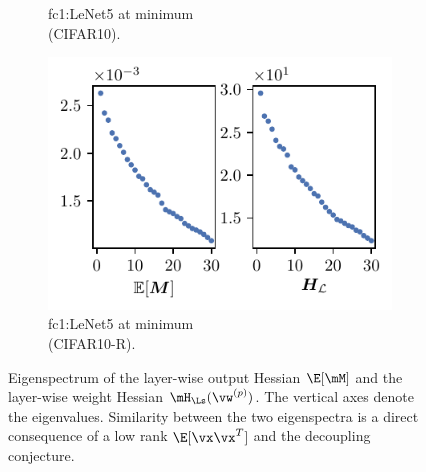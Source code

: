 \begin{figure}[h]
{\begin{subfigure}[b]{0.3\textwidth}
        \caption{fc1:LeNet5 at minimum\\ (CIFAR10).}
        \label{fig:UTAU_H_spec_Lenet}
    \end{subfigure}%
    \begin{subfigure}[b]{0.3\textwidth}
        \centering
        \captionsetup{justification=centering}
        \includegraphics[width=\textwidth]{Figures/EM_vs_H/LeNet5_RL/UTAU_vs_full_sigval_d30_CIFAR10_RandomLabel_LeNet5_fixlr0.01_RLR4_E-1_fc1.pdf}
        \caption{fc1:LeNet5 at minimum\\ (CIFAR10-R).}
        \label{fig:UTAU_H_spec_RL}
    \end{subfigure}%
    }
    
    \caption{Eigenspectrum of the layer-wise output Hessian $\E[\mM]$ and the layer-wise weight Hessian $\mH_\Ls(\vw^{(p)})$. The vertical axes denote the eigenvalues. Similarity between the two eigenspectra is a direct consequence of a low rank $\E[\vx\vx^T]$ and the decoupling conjecture.}
    \label{fig:UTAU_H_spec}
    \vskip -0.05in
\end{figure}

